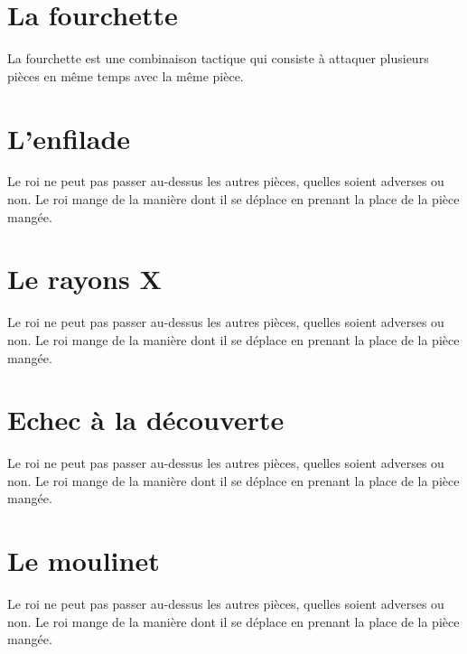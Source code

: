 \documentclass[a5paper,openany,twocolumn]{book}%
\begin{document}
\chapter{La fourchette}

La fourchette est une combinaison tactique qui consiste à attaquer plusieurs pièces en même temps avec la même pièce. 


\chapter{L'enfilade}

Le roi ne peut pas passer au-dessus les autres pièces, quelles soient adverses ou non. Le roi mange de la manière dont il se déplace en prenant la place de la pièce mangée. 


\chapter{Le rayons X}

Le roi ne peut pas passer au-dessus les autres pièces, quelles soient adverses ou non. Le roi mange de la manière dont il se déplace en prenant la place de la pièce mangée. 


\chapter{Echec à la découverte}

Le roi ne peut pas passer au-dessus les autres pièces, quelles soient adverses ou non. Le roi mange de la manière dont il se déplace en prenant la place de la pièce mangée. 


\chapter{Le moulinet}

Le roi ne peut pas passer au-dessus les autres pièces, quelles soient adverses ou non. Le roi mange de la manière dont il se déplace en prenant la place de la pièce mangée. 
\end{document}
